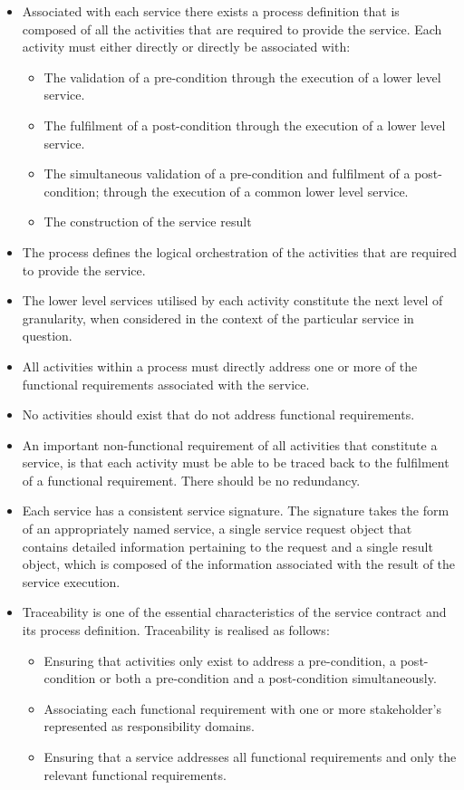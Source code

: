 \begin{itemize}
\begin{itemize}
\begin{itemize}
					\item Associated with each service there exists a process definition that is composed of all the activities that are required to provide the service. Each activity must either directly or directly be associated with:
						\begin{itemize}
							\item The validation of a pre-condition through the execution of a lower level service.
							\item The fulfilment of a post-condition through the execution of a lower level service.
							\item The simultaneous validation of a pre-condition and fulfilment of a post-condition; through the execution of a common lower level service.
							\item The construction of the service result
						\end{itemize}
					\item The process defines the logical orchestration of the activities that are required to provide the service.
					\item The lower level services utilised by each activity constitute the next level of granularity, when considered in the context of the particular service in question.
					\item All activities within a process must directly address one or more of the functional requirements associated with the service.
					\item No activities should exist that do not address functional requirements.
					\item An important non-functional requirement of all activities that constitute a service, is that each activity must be able to be traced back to the fulfilment of a functional requirement. There should be no redundancy.
					\item Each service has a consistent service signature. The signature takes the form of an appropriately named service, a single service request object that contains detailed information pertaining to the request and a single result object, which is composed of the information associated with the result of the service execution.
					\item Traceability is one of the essential characteristics of the service contract and its process definition. Traceability is realised as follows:
						\begin{itemize}
							\item Ensuring that activities only exist to address a pre-condition, a post-condition or both a pre-condition and a post-condition simultaneously.
							\item Associating each functional requirement with one or more stakeholder's represented as responsibility domains.
							\item Ensuring that a service addresses all functional requirements and only the relevant functional requirements.
						\end{itemize}
			\end{itemize}
		\end{itemize}
		

\end{itemize}
